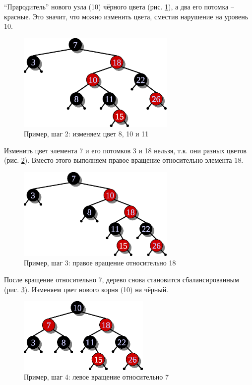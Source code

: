 \documentclass[11pt]{article}
\begin{document}
``Прародитель'' нового узла (10) чёрного цвета (рис. \ref{fig:example2}), а два его потомка -- красные. Это значит, что можно изменить цвета, сместив нарушение на уровень 10.
\begin{figure}[h!]
  \centering
  \includegraphics[width=3in]{lecture10/example2.eps}
  \caption{Пример, шаг 2: изменяем цвет 8, 10 и 11}
  \label{fig:example2}
\end{figure}

Изменить цвет элемента 7 и его потомков 3 и 18 нельзя, т.к. они разных цветов (рис. \ref{fig:example3}). Вместо этого выполняем правое вращение относительно элемента 18.
\begin{figure}[h!]
  \centering
  \includegraphics[width=3in]{lecture10/example3.eps}
  \caption{Пример, шаг 3: правое вращение относительно 18}
  \label{fig:example3}
\end{figure}

После вращение относительно 7, дерево снова становится сбалансированным (рис. \ref{fig:example4}). Изменяем цвет нового корня (10) на чёрный.
\begin{figure}[h!]
  \centering
  \includegraphics[width=2.5in]{lecture10/example4.eps}
  \caption{Пример, шаг 4: левое вращение относительно 7}
  \label{fig:example4}
\end{figure}
\end{document}
